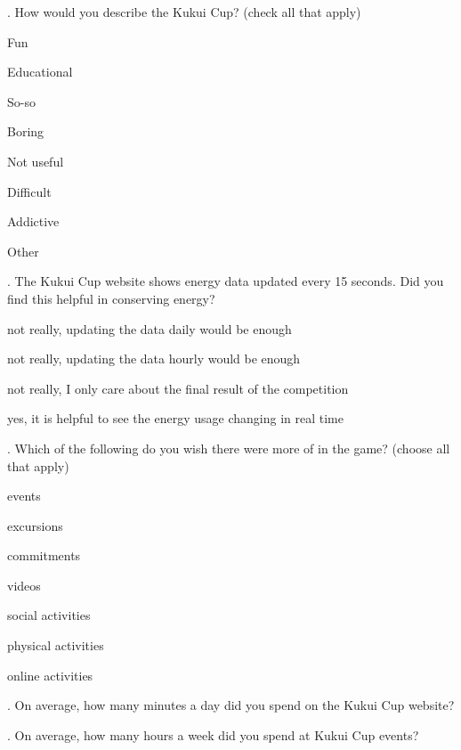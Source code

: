 \vspace{5 mm}
. How would you describe the Kukui Cup? (check all that apply)

\begin{checkbox}
	\item Fun
	\item Educational
	\item So-so
	\item Boring
	\item Not useful
	\item Difficult
	\item Addictive
	\item Other
\end{checkbox}

\vspace{5 mm}
. The Kukui Cup website shows energy data updated every 15 seconds. Did you find this helpful in conserving energy?

\begin{radiobutton}
	\item not really, updating the data daily would be enough
	\item not really, updating the data hourly would be enough
	\item not really, I only care about the final result of the competition
	\item yes, it is helpful to see the energy usage changing in real time
\end{radiobutton}

\vspace{5 mm}
. Which of the following do you wish there were more of in the game? (choose all that apply)

\begin{checkbox}
	\item events
	\item excursions
	\item commitments
	\item videos
	\item social activities
	\item physical activities
	\item online activities
\end{checkbox}

\vspace{5 mm}
. On average, how many minutes a day did you spend on the Kukui Cup website?

\vspace{5 mm}
. On average, how many hours a week did you spend at Kukui Cup events?


